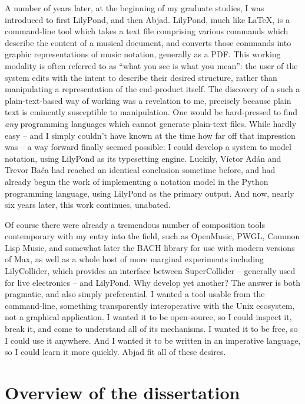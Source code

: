A number of years later, at the beginning of my graduate studies, I was
introduced to first LilyPond, and then Abjad. LilyPond, much like \LaTeX{},
is a command-line tool which takes a text file comprising various commands
which describe the content of a musical document, and converts those commands
into graphic representations of music notation, generally as a PDF. This
working modality is often referred to as \enquote{what you see is what you
mean}: the user of the system edits with the intent to describe their desired
structure, rather than manipulating a representation of the end-product itself.
The discovery of a such a plain-text-based way of working was a revelation to
me, precisely because plain text is eminently susceptible to manipulation. One
would be hard-pressed to find \emph{any} programming languages which cannot
generate plain-text files. While hardly easy -- and I simply couldn't have
known at the time how far off that impression was -- a way forward finally
seemed possible: I could develop a system to model notation, using LilyPond as
its typesetting engine. Luckily, V\'{i}ctor Ad\'{a}n and Trevor Ba\v{c}a had
reached an identical conclusion sometime before, and had already begun the work
of implementing a notation model in the Python programming language, using
LilyPond as the primary output. And now, nearly six years later, this work
continues, unabated.

Of course there were already a tremendous number of composition tools
contemporary with my entry into the field, such as
OpenMusic,\cite{assayag1999sw} PWGL,\cite{laurson2009qf, kuuskankare2004recent}
Common Lisp Music,\cite{taube1991common} and somewhat later the
BACH\cite{agostini2013real} library for use with modern versions of Max, as
well as a whole host of more marginal experiments including LilyCollider, which
provides an interface between SuperCollider\cite{mccartney2002rethinking} --
generally used for live electronics -- and LilyPond. Why develop yet another?
The answer is both pragmatic, and also simply preferential. I wanted a tool
usable from the command-line, something transparently interoperative with the
Unix ecosystem, not a graphical application. I wanted it to be open-source, so
I could inspect it, break it, and come to understand all of its mechanisms. I
wanted it to be free, so I could use it anywhere. And I wanted it to be written
in an imperative language, so I could learn it more quickly. Abjad fit all of
these desires.

\section{Overview of the dissertation}
\label{sec:overview-of-the-dissertation}

